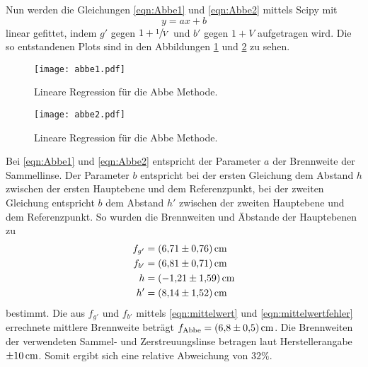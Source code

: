 Nun werden die Gleichungen \eqref{eqn:Abbe1} und \eqref{eqn:Abbe2} mittels Scipy mit
\begin{equation*}
  y=ax+b
\end{equation*}
linear gefittet, indem $g'$ gegen $1+\sfrac{1}{V}$ und $b'$ gegen $1+V$ aufgetragen wird.
Die so entstandenen Plots sind in den Abbildungen \ref{fig:abbe1} und \ref{fig:abbe2} zu sehen.
\begin{figure}
  \centering
  \texttt{[image: abbe1.pdf]}
  \caption{Lineare Regression für die Abbe Methode.}
  \label{fig:abbe1}
\end{figure}
\begin{figure}
  \centering
  \texttt{[image: abbe2.pdf]}
  \caption{Lineare Regression für die Abbe Methode.}
  \label{fig:abbe2}
\end{figure}
Bei \eqref{eqn:Abbe1} und \eqref{eqn:Abbe2} entspricht der Parameter $a$ der Brennweite der Sammellinse. Der Parameter $b$ entspricht bei der ersten Gleichung dem Abstand
$h$ zwischen der ersten Hauptebene und dem Referenzpunkt, bei der zweiten Gleichung entspricht $b$ dem Abstand $h'$ zwischen der zweiten Hauptebene und dem
Referenzpunkt. So wurden die Brennweiten und Äbstande der Hauptebenen zu
\begin{align*}
  f_{g'} &= \SI{6.71\pm0.76}{\centi\metre} \\
  f_{b'} &= \SI{6.81\pm0.71}{\centi\metre} \\
  h &= \SI{-1.21\pm1.59}{\centi\metre} \\
  h' &= \SI{8.14\pm1.52}{\centi\metre}
\end{align*}
bestimmt.
Die aus $f_{g'}$ und $f_{b'}$ mittels \eqref{eqn:mittelwert} und \eqref{eqn:mittelwertfehler} errechnete mittlere Brennweite beträgt $f_\text{Abbe}=\SI{6.8\pm0.5}{\centi\metre}$.
Die Brennweiten der verwendeten Sammel- und Zerstreuungslinse betragen laut Herstellerangabe $\SI{\pm10}{\centi\metre}$. Somit ergibt sich eine
relative Abweichung von $32 \%$.
